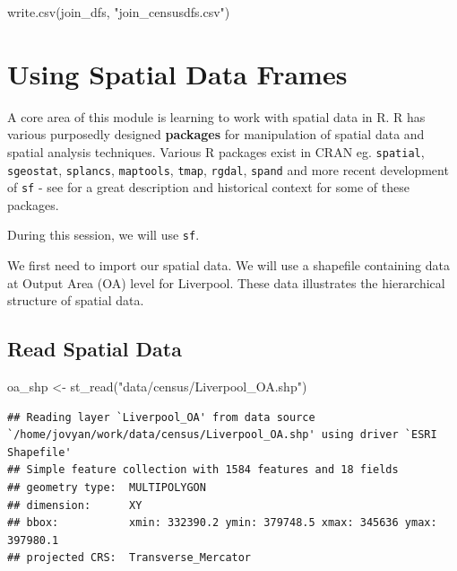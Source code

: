 \documentclass[
]{book}
\newenvironment{Shaded}{\begin{snugshade}}{\end{snugshade}}
\newcommand{\FunctionTok}[1]{\textcolor[rgb]{0.00,0.00,0.00}{#1}}
\newcommand{\NormalTok}[1]{#1}
\newcommand{\OtherTok}[1]{\textcolor[rgb]{0.56,0.35,0.01}{#1}}
\newcommand{\StringTok}[1]{\textcolor[rgb]{0.31,0.60,0.02}{#1}}
\begin{document}
\begin{Shaded}
\begin{Highlighting}[]
\FunctionTok{write.csv}\NormalTok{(join\_dfs, }\StringTok{"join\_censusdfs.csv"}\NormalTok{)}
\end{Highlighting}
\end{Shaded}

\hypertarget{using-spatial-data-frames}{%
\section{Using Spatial Data Frames}\label{using-spatial-data-frames}}

A core area of this module is learning to work with spatial data in R. R has various purposedly designed \textbf{packages} for manipulation of spatial data and spatial analysis techniques. Various R packages exist in CRAN eg. \texttt{spatial}, \texttt{sgeostat}, \texttt{splancs}, \texttt{maptools}, \texttt{tmap}, \texttt{rgdal}, \texttt{spand} and more recent development of \texttt{sf} - see \citet{Lovelace_et_al_2020_book} for a great description and historical context for some of these packages.

During this session, we will use \texttt{sf}.

We first need to import our spatial data. We will use a shapefile containing data at Output Area (OA) level for Liverpool. These data illustrates the hierarchical structure of spatial data.

\hypertarget{read-spatial-data}{%
\subsection{Read Spatial Data}\label{read-spatial-data}}

\begin{Shaded}
\begin{Highlighting}[]
\NormalTok{oa\_shp }\OtherTok{\textless{}{-}} \FunctionTok{st\_read}\NormalTok{(}\StringTok{"data/census/Liverpool\_OA.shp"}\NormalTok{)}
\end{Highlighting}
\end{Shaded}

\begin{verbatim}
## Reading layer `Liverpool_OA' from data source `/home/jovyan/work/data/census/Liverpool_OA.shp' using driver `ESRI Shapefile'
## Simple feature collection with 1584 features and 18 fields
## geometry type:  MULTIPOLYGON
## dimension:      XY
## bbox:           xmin: 332390.2 ymin: 379748.5 xmax: 345636 ymax: 397980.1
## projected CRS:  Transverse_Mercator
\end{verbatim}
\end{document}
